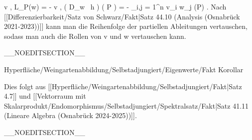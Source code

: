 {\mavergleichskettealign
{\vergleichskettealign
{ \left\langle  v  ,  L_P(w)  \right\rangle
}
{ =} { - {  } \left\langle  v  ,  \left(  D_{w}
 \,  h   \right) \left(   P   \right)   \right\rangle
}
{ =} { -  {  }  \sum_{i,j = 1}^n v_i  w_j  {  } {  }  (P)
}
{ } {
}
{ } {
}
}
{}
{}{.}
Nach
[[Differenzierbarkeit/Satz von Schwarz/Fakt|Satz 44.10 (Analysis (Osnabrück 2021-2023))]]
kann man die Reihenfolge der partiellen Ableitungen vertauschen, sodass man auch die Rollen von
\mathkor {} {v} {und} {w} {}
vertauschen kann.

}

__NOEDITSECTION__

{Hyperfläche/Weingartenabbildung/Selbstadjungiert/Eigenwerte/Fakt}
{Korollar}
{}
{

\faktzusatz {}
\faktzusatz {}

}
{

Dies folgt aus
[[Hyperfläche/Weingartenabbildung/Selbstadjungiert/Fakt|Satz 4.7]]
und
[[Vektorraum mit Skalarprodukt/Endomorphismus/Selbstadjungiert/Spektralsatz/Fakt|Satz 41.11 (Lineare Algebra (Osnabrück 2024-2025))]].

}

__NOEDITSECTION__

